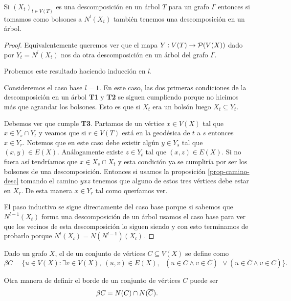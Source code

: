 \documentclass[tesis.tex]{subfiles}
\begin{document}
\begin{prop}\label{prop-vecinos-desc}
	Si $(X_t)_{t \in V(T)}$ es una descomposición en un árbol $T$ para un grafo $\Gamma$ entonces si tomamos como bolsones a $N^l(X_t)$ también tenemos una descomposición en un árbol.
\end{prop}
\begin{proof}
	Equivalentemente queremos ver que el mapa $Y: V(T) \to {\cal P}(V(X))$ dado por $Y_t = N^l(X_t)$ nos da otra descomposición en un árbol del grafo $\Gamma$.
	
	Probemos este resultado haciendo inducción en $l$.
	
	Consideremos el caso base $l=1$.
	En este caso, las dos primeras condiciones de la descomposición en un árbol \textbf{T1} y \textbf{T2} se siguen cumpliendo porque no hicimos más que agrandar los bolsones. 
	Esto es que si $X_t$ era un bolsón luego $X_t \subseteq Y_t$.
	
	Debemos ver que cumple \textbf{T3}.
	Partamos de un vértice $x \in V(X)$ tal que $x \in Y_s \cap Y_t$ y veamos que si $r \in V(T)$ está en la geodésica de $t$ a $s$ entonces $x \in Y_r$.
	Notemos que en este caso debe existir algún $y \in Y_s$ tal que $(x,y) \in E(X)$.
	Análogamente existe $z \in Y_t$ tal que $(x,z) \in E(X)$.
	Si no fuera así tendríamos que $x \in X_s \cap X_t$ y esta condición ya se cumpliría por ser los bolsones de una descomposición.
	Entonces si usamos la proposición \ref{prop-camino-desc} tomando el camino $yxz$ tenemos que alguno de estos tres vértices debe estar en $X_r$.
	De esta manera $x \in Y_r$ tal como queríamos ver.
	
	El paso inductivo se sigue directamente del caso base porque si sabemos que $N^{l-1}(X_t)$ forma una descomposición de un árbol usamos el caso base para ver que los vecinos de esta descomposición lo siguen siendo y con esto terminamos de probarlo porque $N^l(X_t) = N (N^{l-1})(X_t)$.
\end{proof}
\medskip

\begin{deff}
	Dado un grafo $X$, el  de un conjunto de vértices $C \subseteq V(X)$ se define como
	\[
	\beta C = \{ u \in V(X) : \exists v \in V(X), \ (u,v) \in E(X), \  \ \ (u \in C \wedge v \in \overline C) \ \ \lor  (u \in \overline C \wedge v \in  C)   \}.
	\] 
\end{deff}

\begin{obs}
Otra manera de definir el borde de un conjunto de vértices $C$ puede ser 
\[
	\beta C = N(C) \cap N(\overline{ C}).
\]
\end{obs}
\end{document}
